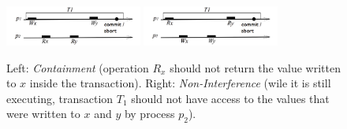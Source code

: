 \begin{figure}[ht]
\centerline{
     \mbox{\includegraphics[width=0.4\textwidth]{SI/imgs/non_containment}}     
    \mbox{\includegraphics[width=0.4\textwidth]{SI/imgs/interference}}
}
\caption{Left:  {\it Containment}  (operation $R_x$  should not  return the
    value written to $x$ inside the transaction). 
Right:  {\it  Non-Interference} (wile  it is still  executing, transaction
$T_1$ should not have access to the values that were written to $x$ and $y$
by process $p_2$).} 
\label{fig:int-nonc}
\end{figure}




 


